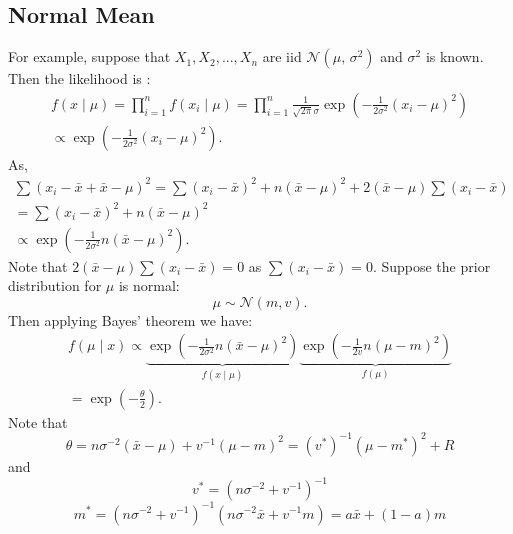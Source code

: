\documentclass[lecture,12pt,]{pcms-l}
\numberwithin{section}{chapter}
\numberwithin{equation}{chapter}
\theoremstyle{plain}
\theoremstyle{definition}
\theoremstyle{definition}
\begin{document}
\subsection{Normal Mean}
For example, suppose that $X_1, X_2,...,X_n$ are iid $ \mathcal{N}(\mu,\,\sigma^{2})$ and $\sigma^2$ is known. Then the likelihood is :
\begin{equation}
\begin{split}
f(x \mid \mu)= \prod_{i=1}^{n}f(x_i \mid \mu)=\prod_{i=1}^{n}\frac{1}{\sqrt{2\pi}\sigma}\exp\left (  -\frac{1}{2\sigma^2}(x_i -\mu)^2 \right )
\\
\propto \exp\left (  -\frac{1}{2\sigma^2}(x_i -\mu)^2 \right ).
\end{split}
\end{equation}
As,
\begin{equation}
\begin{split}
\sum (x_i-\bar{x}+\bar{x}-\mu)^2=\sum (x_i-\bar{x})^2+n(\bar{x}-\mu)^2+2(\bar{x}-\mu)\sum(x_i-\bar{x})
\\
=\sum (x_i-\bar{x})^2+n(\bar{x}-\mu)^2
\\
\propto \exp\left (  -\frac{1}{2\sigma^2}n(\bar{x} -\mu)^2 \right ).
\end{split}
\end{equation}
Note that $2(\bar{x}-\mu)\sum(x_i-\bar{x})=0$ as $\sum(x_i-\bar{x})=0$. Suppose the prior distribution for $\mu$ is normal:
\begin{equation}
\mu \sim \mathcal{N}(m,v).
\end{equation}
Then applying Bayes' theorem we have:
\begin{equation}
\begin{split}
f(\mu \mid x) \propto \underbrace{\exp\left (  -\frac{1}{2\sigma^2}n(\bar{x} -\mu)^2 \right )}_{f(x \mid \mu)} \underbrace{\exp\left (  -\frac{1}{2 v}n(\mu-m)^2 \right )}_{f(\mu)}
\\
=\exp\left (  -\frac{\theta}{2} \right ).
\end{split}
\end{equation}
Note that
\begin{equation}
\theta=n \sigma^{-2}(\bar{x}-\mu)+v^{-1}(\mu-m)^2=(v^*)^{-1}(\mu-m^*)^2+R
\end{equation}
and 
\begin{equation}
v^*=(n\sigma^{-2}+v^{-1})^{-1}
\end{equation}
\begin{equation}
m^*=(n\sigma^{-2}+v^{-1})^{-1}(n \sigma^{-2}\bar{x}+v^{-1}m)=a \bar{x}+(1-a)m 
\end{equation}
\end{document}
